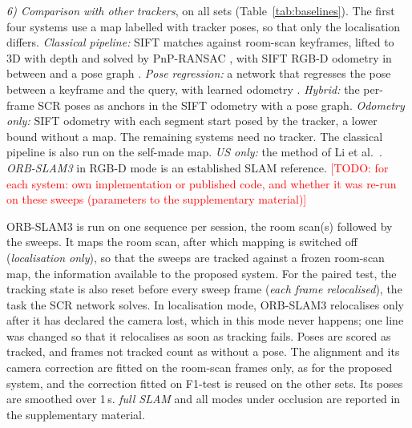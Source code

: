 \documentclass[9pt,shortpaper,twoside,web]{ieeecolor2}
\newcommand{\tbd}[1]{\textcolor{red}{[TODO: #1]}}
\newcommand{\Ftest}{F1-test}
\newcommand{\fullslam}{\emph{full SLAM}}
\newcommand{\loconly}{\emph{localisation only}}
\newcommand{\reloc}{\emph{each frame relocalised}}
\begin{document}
\emph{6) Comparison with other trackers}, on all sets (Table~\ref{tab:baselines}). The first four systems use a map labelled with tracker poses, so that only the localisation differs. \emph{Classical pipeline:} SIFT \cite{lowe2004sift} matches against room-scan keyframes, lifted to 3D with depth and solved by PnP-RANSAC \cite{lepetit2009epnp}, with SIFT RGB-D odometry in between and a pose graph \cite{liu2025rgb}. \emph{Pose regression:} a network that regresses the pose between a keyframe and the query, with learned odometry \cite{TODO-own-pose-regression}. \emph{Hybrid:} the per-frame SCR poses as anchors in the SIFT odometry with a pose graph. \emph{Odometry only:} SIFT odometry with each segment start posed by the tracker, a lower bound without a map. The remaining systems need no tracker. The classical pipeline is also run on the self-made map. \emph{US only:} the method of Li et al.\ \cite{li2024longterm}. \emph{ORB-SLAM3} \cite{campos2021orbslam3} in RGB-D mode is an established SLAM reference. \tbd{for each system: own implementation or published code, and whether it was re-run on these sweeps (parameters to the supplementary material)}

ORB-SLAM3 is run on one sequence per session, the room scan(s) followed by the sweeps. It maps the room scan, after which mapping is switched off (\loconly{}), so that the sweeps are tracked against a frozen room-scan map, the information available to the proposed system. For the paired test, the tracking state is also reset before every sweep frame (\reloc{}), the task the SCR network solves. In localisation mode, ORB-SLAM3 relocalises only after it has declared the camera lost, which in this mode never happens; one line was changed so that it relocalises as soon as tracking fails. Poses are scored as tracked, and frames not tracked count as without a pose. The alignment and its camera correction are fitted on the room-scan frames only, as for the proposed system, and the correction fitted on \Ftest{} is reused on the other sets. Its poses are smoothed over 1\,s. \fullslam{} and all modes under occlusion are reported in the supplementary material.
\end{document}
